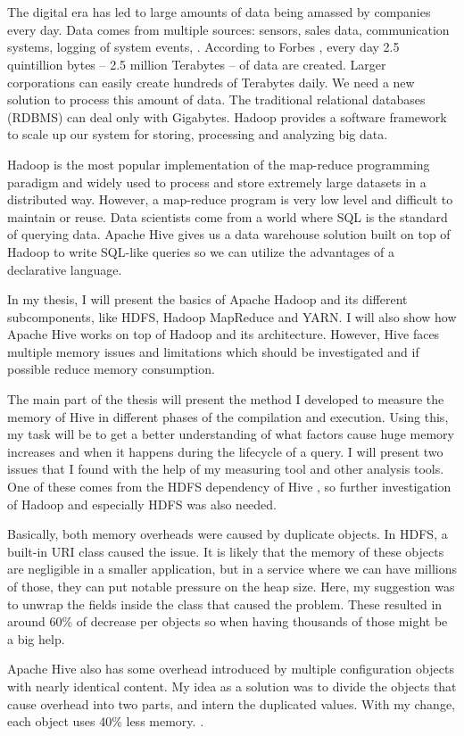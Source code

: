 \chapter{\bevezetes}

The digital era has led to large amounts of data being amassed by companies every day. Data comes from multiple sources: sensors, sales data, communication systems, logging of system events, \etc. According to Forbes \cite{Forbes}, every day 2.5 quintillion bytes – 2.5 million Terabytes – of data are created. Larger corporations can easily create hundreds of Terabytes daily. We need a new solution to process this amount of data. The traditional relational databases (RDBMS) can deal only with Gigabytes. Hadoop provides a software framework to scale up our system for storing, processing and analyzing big data.

Hadoop is the most popular implementation of the map-reduce programming paradigm and widely used to process and store extremely large datasets in a distributed way. However, a map-reduce program is very low level and difficult to maintain or reuse. Data scientists come from a world where SQL is the standard of querying data. Apache Hive gives us a data warehouse solution built on top of Hadoop to write SQL-like queries so we can utilize the advantages of a declarative language.

In my thesis, I will present the basics of Apache Hadoop and its different subcomponents, like HDFS, Hadoop MapReduce and YARN. I will also show how Apache Hive works on top of Hadoop and its architecture. However, Hive faces multiple memory issues and limitations which should be investigated and if possible reduce memory consumption.

The main part of the thesis will present the method  I developed to measure the memory of Hive in different phases of the compilation and execution. Using this, my task will be to get a better understanding of what factors cause huge memory increases and when it happens during the lifecycle of a query. I will present two issues that I found with the help of my measuring tool and other analysis tools. One of these comes from the HDFS dependency of Hive \cite{hdfs-path}, so further investigation of Hadoop and especially HDFS was also needed. 


Basically, both memory overheads were caused by duplicate objects. In HDFS, a built-in URI class caused the issue. It is likely that the memory of these objects are negligible in a smaller application, but in a service where we can have millions of those, they can put notable pressure on the heap size. Here, my suggestion was to unwrap the fields inside the class that caused the problem. These resulted in around 60\% of decrease per objects so when having thousands of those might be a big help.

Apache Hive also has some overhead introduced by multiple configuration objects with nearly identical content. My idea as a solution was to divide the objects that cause overhead into two parts, and intern the duplicated values. With my change, each object uses 40\% less memory. \cite{hive-conf}.